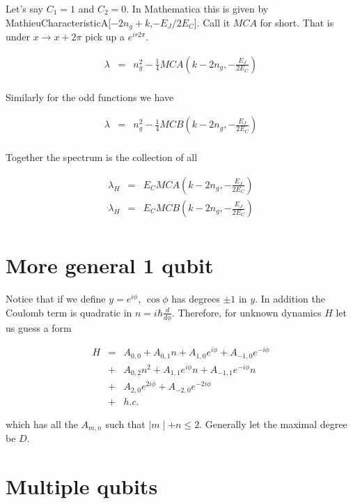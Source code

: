 \documentclass[11pt]{article}
\theoremstyle{change}
\theoremstyle{nonumberplain}
\numberwithin{equation}{section}
\newcommand\abs[1]{ \mid #1 \mid }
\begin{document}
Let's say $C_1=1$ and $C_2 = 0$. In Mathematica this is given by MathieuCharacteristicA[$-2 n_g+k$,$-E_J/2E_C$]. Call it $MCA$ for short. That is under $x \to x + 2 \pi$ pick up a $e^{i r 2 \pi}$.

\begin{eqnarray*}
\lambda &=& n_g^2 -\frac{1}{4} MCA ( k - 2 n_g, -\frac{E_J}{2E_C} )\\
\end{eqnarray*}

Similarly for the odd functions we have 

\begin{eqnarray*}
\lambda &=& n_g^2 -\frac{1}{4} MCB ( k - 2 n_g, -\frac{E_J}{2E_C} )\\
\end{eqnarray*}

Together the spectrum is the collection of all

\begin{eqnarray*}
\lambda_H &=& E_C MCA ( k -2  n_g, -\frac{E_J}{2E_C} )\\
\lambda_H &=&  E_C MCB ( k -2  n_g, -\frac{E_J}{2E_C} )\\
\end{eqnarray*}

\section{More general 1 qubit}

Notice that if we define $y = e^{i \phi}$, $\cos \phi$ has degrees $\pm 1$ in $y$. In addition the Coulomb term is quadratic in $n=i \hbar \frac{d}{d\phi}$. Therefore, for unknown dynamics $H$ let us guess a form

\begin{eqnarray*}
H &=& A_{0,0} + A_{0,1} n + A_{1,0} e^{i \phi} + A_{-1,0} e^{- i \phi} \\
&+& A_{0,2} n^2 + A_{1,1} e^{i \phi} n + A_{-1,1} e^{-i\phi} n \\
&+& A_{2,0} e^{2 i \phi} + A_{-2,0} e^{-2 i \phi}\\
&+& h.c.
\end{eqnarray*}

which has all the $A_{m,n}$ such that $\abs{m} + n \leq 2$. Generally let the maximal degree be $D$.

\section{Multiple qubits}
\end{document}
